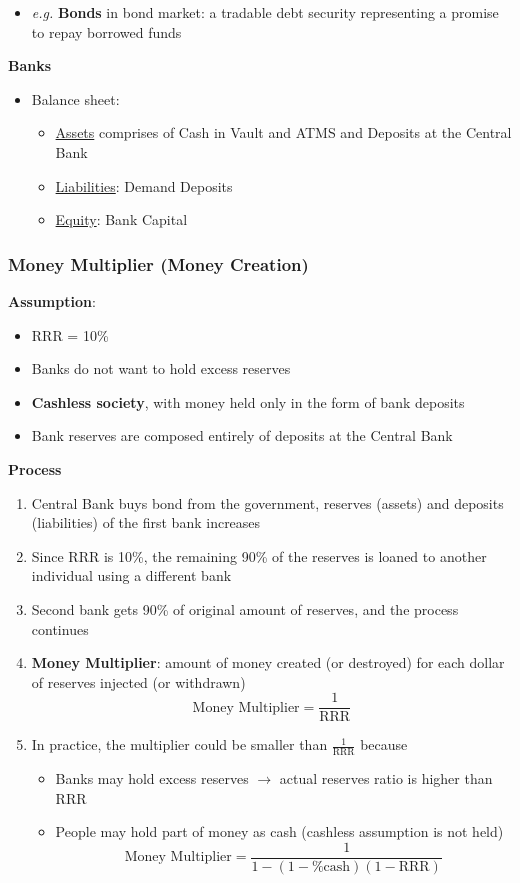 \documentclass{article}
\newcommand{\eg}[0]{\textit{e.g. }}
\begin{document}
\begin{multicols}{2}
\begin{itemize}
\begin{itemize}
		\item \eg \textbf{Bonds} in bond market: a tradable debt security representing a promise to repay borrowed funds
	\end{itemize}
\end{itemize}
\textbf{Banks}
\begin{itemize}
	\item Balance sheet:
	\begin{itemize}
		\item \underline{Assets} comprises of Cash in Vault and ATMS and Deposits at the Central Bank
		\item \underline{Liabilities}: Demand Deposits
		\item \underline{Equity}: Bank Capital
	\end{itemize}
\end{itemize}


\subsubsection{Money Multiplier (Money Creation)}
\textbf{Assumption}:
\begin{itemize}
	\item RRR = 10\%
	\item Banks do not want to hold excess reserves
	\item \textbf{Cashless society}, with money held only in the form of bank deposits
	\item Bank reserves are composed entirely of deposits at the Central Bank
\end{itemize}
\textbf{Process}
\begin{enumerate}
	\item Central Bank buys bond from the government, reserves (assets) and deposits (liabilities) of the first bank increases
	\item Since RRR is 10\%, the remaining 90\% of the reserves is loaned to another individual using a different bank
	\item Second bank gets 90\% of original amount of reserves, and the process continues
	\item \textbf{Money Multiplier}: amount of money created (or destroyed) for each dollar of reserves injected (or withdrawn)
	$$\text{Money Multiplier} = \frac{1}{\text{RRR}}$$
	\item In practice, the multiplier could be smaller than $\frac{1}{\text{RRR}}$ because
	\begin{itemize}
		\item Banks may hold excess reserves $\rightarrow$ actual reserves ratio is higher than RRR
		\item People may hold part of money as cash (cashless assumption is not held)
		$$\text{Money Multiplier} = \frac{1}{1-(1-\%\text{cash})(1-\text{RRR})}$$
	\end{itemize}
\end{enumerate}

\end{multicols}
\end{document}
